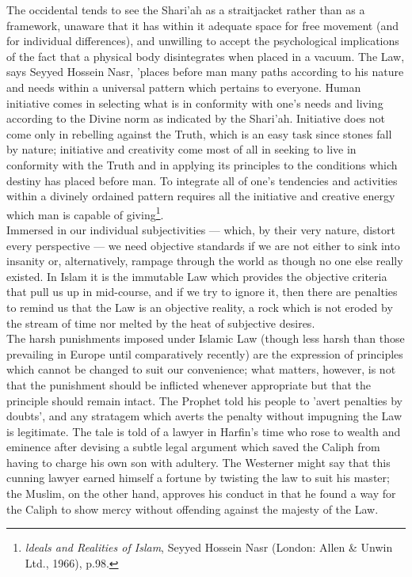 \documentclass[11pt, b5paper, twoside]{book}
\begin{document}
The occidental tends to see the Shari'ah as a straitjacket rather than as a framework, unaware that 
it has within it adequate space for free movement (and for individual differences), and unwilling to 
accept the psychological implications of the fact that a physical body disintegrates when placed in a 
vacuum. The Law, says Seyyed Hossein Nasr, 'places before man many paths according to his nature and 
needs within a universal pattern which pertains to everyone. Human initiative comes in selecting what 
is in conformity with one's needs and living according to the Divine norm as indicated by the 
Shari'ah. Initiative does not come only in rebelling against the Truth, which is an easy task since 
stones fall by nature; initiative and creativity come most of all in seeking to live in conformity 
with the Truth and in applying its principles to the conditions which destiny has placed before man. 
To integrate all of one's tendencies and activities within a divinely ordained pattern requires all 
the initiative and creative energy which man is capable of giving\footnote{\emph{ldeals and Realities of Islam}, Seyyed Hossein Nasr (London: Allen \& Unwin Ltd., 1966), p.98.}. \\

Immersed in our individual subjectivities --- which, by their very nature, distort every perspective --- 
we need objective standards if we are not either to sink into insanity or, alternatively, rampage 
through the world as though no one else really existed. In Islam it is the immutable Law which 
provides the objective criteria that pull us up in mid-course, and if we try to ignore it, then there 
are penalties to remind us that the Law is an objective reality, a rock which is not eroded by the 
stream of time nor melted by the heat of subjective desires. \\

The harsh punishments imposed under Islamic Law (though less harsh than those prevailing in Europe 
until comparatively recently) are the expression of principles which cannot be changed to suit our 
convenience; what matters, however, is not that the punishment should be inflicted whenever 
appropriate but that the principle should remain intact. The Prophet told his people to 'avert 
penalties by doubts', and any stratagem which averts the penalty without impugning the Law is 
legitimate. The tale is told of a lawyer in Harfin's time who rose to wealth and eminence after 
devising a subtle legal argument which saved the Caliph from having to charge his own son with 
adultery. The Westerner might say that this cunning lawyer earned himself a fortune by twisting the 
law to suit his master; the Muslim, on the other hand, approves his conduct in that he found a way 
for the Caliph to show mercy without offending against the majesty of the Law. \\
\end{document}
